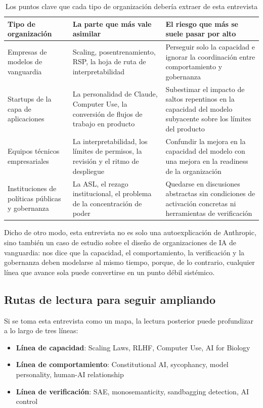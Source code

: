 \documentclass[a4paper]{article}
\begin{document}
\begin{table}[H]
\centering
\begin{tabular}{p{} p{} p{}}
\toprule
Tipo de organización & La parte que más vale asimilar & El riesgo que más se suele pasar por alto \\
\midrule
Empresas de modelos de vanguardia & Scaling, posentrenamiento, RSP, la hoja de ruta de interpretabilidad & Perseguir solo la capacidad e ignorar la coordinación entre comportamiento y gobernanza \\
Startups de la capa de aplicaciones & La personalidad de Claude, Computer Use, la conversión de flujos de trabajo en producto & Subestimar el impacto de saltos repentinos en la capacidad del modelo subyacente sobre los límites del producto \\
Equipos técnicos empresariales & La interpretabilidad, los límites de permisos, la revisión y el ritmo de despliegue & Confundir la mejora en la capacidad del modelo con una mejora en la readiness de la organización \\
Instituciones de políticas públicas y gobernanza & La ASL, el rezago institucional, el problema de la concentración de poder & Quedarse en discusiones abstractas sin condiciones de activación concretas ni herramientas de verificación \\
\bottomrule
\end{tabular}
\caption{Los puntos clave que cada tipo de organización debería extraer de esta entrevista}
\end{table}

Dicho de otro modo, esta entrevista no es solo una autoexplicación de Anthropic, sino también un caso de estudio sobre el diseño de organizaciones de IA de vanguardia: nos dice que la capacidad, el comportamiento, la verificación y la gobernanza deben modelarse al mismo tiempo, porque, de lo contrario, cualquier línea que avance sola puede convertirse en un punto débil sistémico.

\subsection{Rutas de lectura para seguir ampliando}

Si se toma esta entrevista como un mapa, la lectura posterior puede profundizar a lo largo de tres líneas:

\begin{itemize}
    \item \textbf{Línea de capacidad}: Scaling Laws, RLHF, Computer Use, AI for Biology
    \item \textbf{Línea de comportamiento}: Constitutional AI, sycophancy, model personality, human-AI relationship
    \item \textbf{Línea de verificación}: SAE, monosemanticity, sandbagging detection, AI control
\end{itemize}
\end{document}
